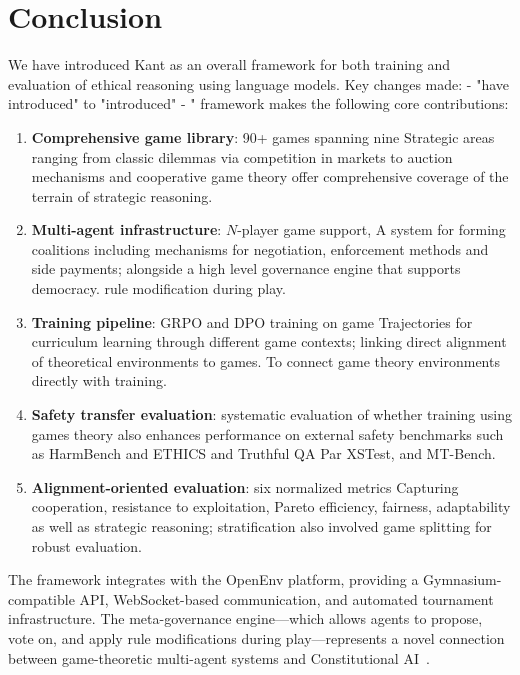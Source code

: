 
\section{Conclusion}
\label{sec:conclusion}

We have introduced Kant as an overall framework for both training and evaluation of ethical reasoning using language models. Key changes made: - "have introduced" to "introduced" - "
framework makes the following core contributions:

\begin{enumerate}[nosep]
    \item \textbf{Comprehensive game library}: 90+ games spanning nine
Strategic areas ranging from classic dilemmas via competition in markets to auction mechanisms and cooperative game theory offer comprehensive coverage of the terrain of strategic reasoning.
    \item \textbf{Multi-agent infrastructure}: $N$-player game support,
A system for forming coalitions including mechanisms for negotiation, enforcement methods and side payments; alongside a high level governance engine that supports democracy.
          rule modification during play.
    \item \textbf{Training pipeline}: GRPO and DPO training on game
Trajectories for curriculum learning through different game contexts; linking direct alignment of theoretical environments to games. To connect game theory environments directly with
          training.
    \item \textbf{Safety transfer evaluation}: systematic evaluation of
whether training using games theory also enhances performance on external safety benchmarks such as HarmBench and ETHICS and Truthful QA Par
          XSTest, and MT-Bench.
    \item \textbf{Alignment-oriented evaluation}: six normalized metrics
Capturing cooperation, resistance to exploitation, Pareto efficiency, fairness, adaptability as well as strategic reasoning; stratification also involved
          game splitting for robust evaluation.
\end{enumerate}

The framework integrates with the OpenEnv platform, providing a
Gymnasium-compatible API, WebSocket-based communication, and automated
tournament infrastructure. The meta-governance engine---which allows agents
to propose, vote on, and apply rule modifications during play---represents
a novel connection between game-theoretic multi-agent systems and
Constitutional AI~\citep{bai2022constitutional}.

